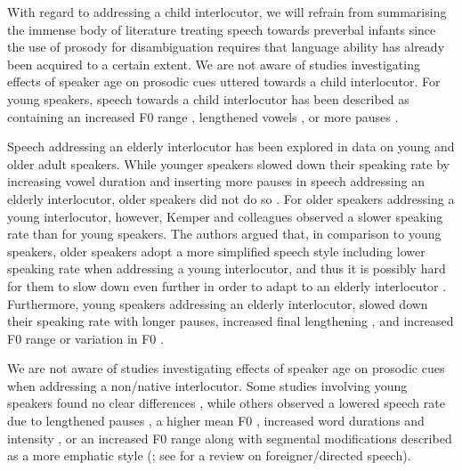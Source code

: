 \documentclass[output=paper]{langscibook}
\begin{document}
With regard to addressing a child interlocutor, we will refrain from summarising the immense body of literature treating speech towards preverbal infants since the use of prosody for disambiguation requires that language ability has already been acquired to a certain extent. We are not aware of studies investigating effects of speaker age on prosodic cues uttered towards a child interlocutor. For young speakers, speech towards a child interlocutor has been described as containing an increased F0 range \citep{biersack_fine-tuning_2005, huttenlauchetal2021}, lengthened vowels \citep{biersack_fine-tuning_2005}, or more pauses \citep{depaulo_talking_1986}.

Speech addressing an elderly interlocutor has been explored in data on young and older adult speakers. While younger speakers slowed down their speaking rate by increasing vowel duration and inserting more pauses in speech addressing an elderly interlocutor, older speakers did not do so \citep{kemper_etal_1995_y+o_speaker+listener}. For older speakers addressing a young interlocutor, however, Kemper and colleagues observed a slower speaking rate than for young speakers. The authors argued that, in comparison to young speakers, older speakers adopt a more simplified speech style including lower speaking rate when addressing a young interlocutor, and thus it is possibly hard for them to slow down even further in order to adapt to an elderly interlocutor \citep[56]{kemper_etal_1995_y+o_speaker+listener}. Furthermore, young speakers addressing an elderly interlocutor, slowed down their speaking rate with longer pauses, increased final lengthening \citep{huttenlauchetal2021}, and increased F0 range or variation in F0 \citep{thimm_age_1998,huttenlauchetal2021}.


We are not aware of studies investigating effects of speaker age on prosodic cues when addressing a non\-/native interlocutor. Some studies involving young speakers found no clear differences \citep{depaulo_talking_1986,uther_etal2007_fds,knoll_scharrer2007_fds, knoll_etal2011_fds,  huttenlauchetal2021}, while others observed a lowered speech rate due to lengthened pauses \citep{biersack_fine-tuning_2005}, a higher mean F0 \citep{knoll_etal2015_fds}, increased word durations and intensity \citep{rodriguez_etal2018_fds}, or an increased F0 range along with segmental modifications described as a more emphatic style (\citealt{smith_prosodic_2007}; see \citealt{piazza_etal2021_FDS_review} for a review on foreigner\-/directed speech).
\end{document}
